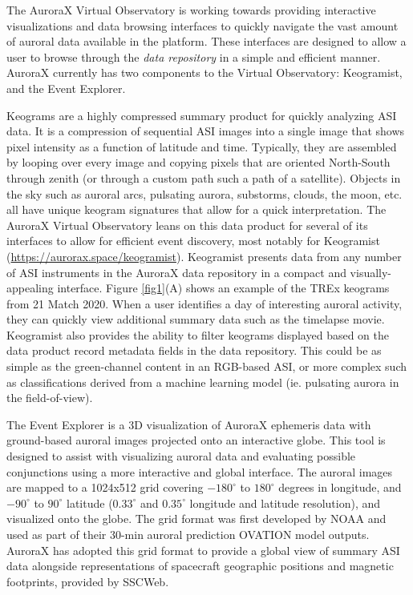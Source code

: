 \documentclass[utf8]{FrontiersinHarvard} %
\begin{document}
The AuroraX Virtual Observatory is working towards providing interactive visualizations and data browsing interfaces to quickly navigate the vast amount of auroral data available in the platform. These interfaces are designed to allow a user to browse through the \textit{data repository} in a simple and efficient manner. AuroraX currently has two components to the Virtual Observatory: Keogramist, and the Event Explorer.

Keograms are a highly compressed summary product for quickly analyzing ASI data. It is a compression of sequential ASI images into a single image that shows pixel intensity as a function of latitude and time. Typically, they are assembled by looping over every image and copying pixels that are oriented North-South through zenith (or through a custom path such a path of a satellite). Objects in the sky such as auroral arcs, pulsating aurora, substorms, clouds, the moon, etc. all have unique keogram signatures that allow for a quick interpretation. The AuroraX Virtual Observatory leans on this data product for several of its interfaces to allow for efficient event discovery, most notably for Keogramist (\url{https://aurorax.space/keogramist}). Keogramist presents data from any number of ASI instruments in the AuroraX data repository in a compact and visually-appealing interface. Figure \ref{fig1}(A) shows an example of the TREx keograms from 21 Match 2020. When a user identifies a day of interesting auroral activity, they can quickly view additional summary data such as the timelapse movie. Keogramist also provides the ability to filter keograms displayed based on the data product record metadata fields in the data repository. This could be as simple as the green-channel content in an RGB-based ASI, or more complex such as classifications derived from a machine learning model (ie. pulsating aurora in the field-of-view).

The Event Explorer is a 3D visualization of AuroraX ephemeris data with ground-based auroral images projected onto an interactive globe. This tool is designed to assist with visualizing auroral data and evaluating possible conjunctions using a more interactive and global interface. The auroral images are mapped to a 1024x512 grid covering $-180^\circ$ to $180^\circ$ degrees in longitude, and $-90^\circ$ to $90^\circ$ latitude ($0.33^\circ$ and $0.35^\circ$ longitude and latitude resolution), and visualized onto the globe. The grid format was first developed by NOAA and used as part of their 30-min auroral prediction OVATION model outputs. AuroraX has adopted this grid format to provide a global view of summary ASI data alongside representations of spacecraft geographic positions and magnetic footprints, provided by SSCWeb.
\end{document}
